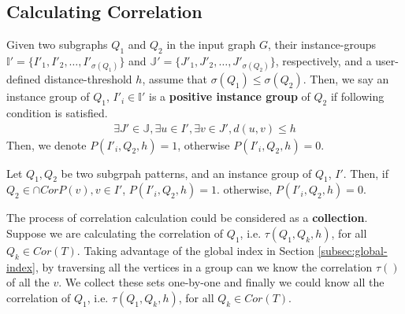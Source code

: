 \subsection{Calculating Correlation}\label{subsec:calculating}
\begin{defn}
Given two subgraphs $Q_1$ and $Q_2$ in the input graph $G$, their instance-groups
$\mathbb{I'}=\{I'_1,I'_2,\ldots,I'_{\sigma(Q_1)}\}$ and $\mathbb{J'}=\{J'_1,J'_2,\ldots,J'_{\sigma(Q_2)}\}$,
respectively, and a user-defined distance-threshold $h$, assume that $\sigma(Q_1) \le \sigma(Q_2)$. 
Then, we say an instance group of $Q_1$, $I'_i\in \mathbb{I'}$ is a {\bf positive instance group} of $Q_2$ if following condition is satisfied.
%
\begin{align}
\exists J' \in \mathbb{J}, \exists u \in I', \exists v \in J', d(u,v)\le h
\end{align}
Then, we denote $P(I'_i,Q_2,h)=1$, otherwise $P(I'_i,Q_2,h)=0$.
\end{defn}	
\begin{thrm}
	Let $Q_1,Q_2$ be two subgrpah patterns, and an instance group of $Q_1$, $I'$. Then,	if $Q_2\in \cap CorP(v),v\in I'$, $P(I'_i,Q_2,h)=1$.
	otherwise, $P(I'_i,Q_2,h)=0$.
\end{thrm}	
The process of correlation calculation could be considered as a {\bf collection}. Suppose we are calculating the correlation of $Q_1$, i.e. $\tau(Q_1,Q_k,h)$, for all $Q_k\in Cor(T)$. Taking advantage of the global index in Section \ref{subsec:global-index}, by traversing all the vertices in a group can we know the correlation $\tau()$ of all the $v$. We collect these sets one-by-one and finally we could know all the correlation of $Q_1$, i.e. $\tau(Q_1,Q_k,h)$, for all $Q_k\in Cor(T)$.

